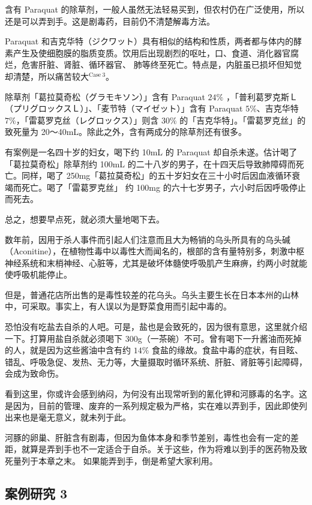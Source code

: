 \documentclass[UTF8]{ctexart}
\begin{document}
含有 Paraquat 的除草剂，一般人虽然无法轻易买到，但农村仍在广泛使用，所以还是可以弄到手。这是剧毒药，目前仍不清楚解毒方法。

Paraquat 和吉克华特（ジクワット）具有相似的结构和性质，两者都与体内的酵素产生及使细胞膜的脂质变质。饮用后出现剧烈的呕吐，口、食道、消化器官腐烂，危害肝脏、肾脏、循环器官、 肺等终至死亡。特点是，内脏虽已损坏但知觉却清楚，所以痛苦较大$^{\mathrm{Case\ 3}}$。

除草剂「葛拉莫奇松（グラモキソン）」含有 Paraquat $24\%$ ，「普利葛罗克斯Ｌ（プリグロックスＬ）」、「麦节特（マイゼット）」含有 Paraquat $5\%$、吉克华特 $7\%$，「雷葛罗克丝（レグロックス）」则含 $30\%$ 的「吉克华特」。「雷葛罗克丝」的致死量为 20～40mL。除此之外，含有两成分的除草剂还有很多。

有案例是一名四十岁的妇女，喝下约 10mL 的 Paraquat 却自杀未遂。估计喝了「葛拉莫奇松」除草剂约 100mL 的二十八岁的男子，在十四天后导致肺障碍而死亡。同样，喝了 250mg「葛拉莫奇松」的五十岁妇女在三十小时后因血液循环衰竭而死亡。喝了「雷葛罗克丝」 约 100mg 的六十七岁男子，六小时后因呼吸停止而死去。

总之，想要早点死，就必须大量地喝下去。

数年前，因用于杀人事件而引起人们注意而且大为畅销的乌头所具有的乌头碱（Aconitine），在植物性毒中以毒性大而闻名的，根部的含有量特别多，刺激中枢神经系统和末梢神经、心脏等，尤其是破坏体髓使呼吸肌产生麻痹，约两小时就能使呼吸机能停止。

但是，普通花店所出售的是毒性较差的花乌头。乌头主要生长在日本本州的山林中，可采取。事实上，有人误以为是野菜食用而引起中毒的。

恐怕没有吃盐去自杀的人吧。可是，盐也是会致死的，因为很有意思，这里就介绍一下。打算用盐自杀就必须喝下 300g（一茶碗）不可。曾有喝下一升酱油而死掉的人，就是因为这些酱油中含有约 $14\%$ 食盐的缘故。食盐中毒的症状，有目眩、错乱、呼吸急促、发热、无力等，大量摄取时循环系统、肝脏、肾脏等引起障碍，会成为致命伤。

看到这里，你或许会感到纳闷，为何没有出现常听到的氰化钾和河豚毒的名字。这是因为，目前的管理、废弃的一系列规定极为严格，实在难以弄到手，因此即使列出来也是毫无意义，就未列于此。

河豚的卵巢、肝脏含有剧毒，但因为鱼体本身和季节差别，毒性也会有一定的差距，就算是弄到手也不一定适合于自杀。关于这些，作为将难以到手的医药物及致死量列于本章之末。 如果能弄到手，倒是希望大家利用。

\subsection{案例研究 3}
\end{document}
